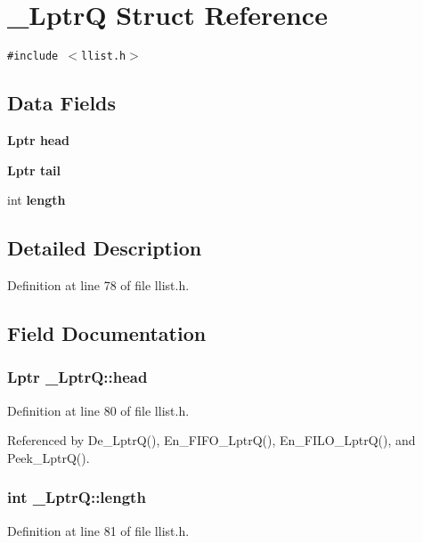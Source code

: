 \section{\_\-Lptr\-Q Struct Reference}
\label{struct__LptrQ}
{\tt \#include $<$llist.h$>$}

\subsection*{Data Fields}
\begin{CompactItemize}
\item 
\bf{Lptr} \bf{head}
\item 
\bf{Lptr} \bf{tail}
\item 
int \bf{length}
\end{CompactItemize}


\subsection{Detailed Description}




Definition at line 78 of file llist.h.

\subsection{Field Documentation}
\subsubsection{\setlength{\rightskip}{0pt plus 5cm}\bf{Lptr} \bf{\_\-Lptr\-Q::head}}\label{struct__LptrQ_86b3cfb5b0b2e4bfa29c30b29c5c8f89}




Definition at line 80 of file llist.h.

Referenced by De\_\-Lptr\-Q(), En\_\-FIFO\_\-Lptr\-Q(), En\_\-FILO\_\-Lptr\-Q(), and Peek\_\-Lptr\-Q().
\subsubsection{\setlength{\rightskip}{0pt plus 5cm}int \bf{\_\-Lptr\-Q::length}}\label{struct__LptrQ_311549888dfcedf299729744aaa1cd3d}




Definition at line 81 of file llist.h.

